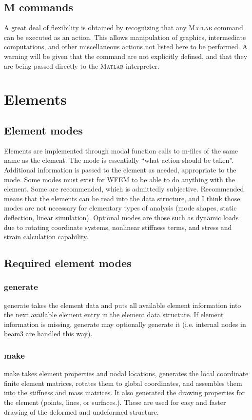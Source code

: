 \documentclass[12pt]{article}
\newcommand*{\command}[1]{\textsf{#1}}
\begin{document}
\subsection{M commands}
A great deal of flexibility is obtained by recognizing that any M\textsc{atlab} command can be executed as an action. This allows manipulation of graphics, intermediate computations, and other miscellaneous actions not listed here to be performed. A warning will be given that the command are not explicitly defined, and that they are being passed directly to the M\textsc{atlab} interpreter. 

\section{Elements}\label{sec:elements}

\subsection{Element modes}
Elements are implemented through modal function calls to m-files of
the same name as the element. The mode is essentially ``what action
should be taken''. Additional information is passed to the element as
needed, appropriate to the mode. Some modes must exist for WFEM to be
able to do anything with the element. Some are recommended, which is
admittedly subjective. Recommended means that the elements can be read
into the data structure, and I think those modes are not necessary for
elementary types of analysis (mode shapes, static deflection, linear
simulation). Optional modes are those such as dynamic loads due to
rotating coordinate systems, nonlinear stiffness terms, and stress and
strain calculation capability.
\subsection{Required element modes}
\subsubsection{\command{generate}}
\command{generate} takes the element data and puts all available
element information into the next available element entry in the
element data structure. If element information is missing, generate
may optionally generate it (i.e. internal nodes in \command{beam3} are
handled this way).
\subsubsection{\command{make}}
\command{make} takes element properties and nodal locations, generates
the local coordinate finite element matrices, rotates them to global
coordinates, and assembles them into the stiffness and mass matrices.
It also generated the drawing properties for the element (points,
lines, or surfaces.). These are used for easy and faster drawing of
the deformed and undeformed structure.
\end{document}
